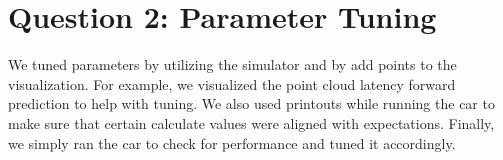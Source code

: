 \section{Question 2: Parameter Tuning}

We tuned parameters by utilizing the simulator and by add points to the visualization. For example, we visualized the point cloud latency forward prediction to help with tuning. We also used printouts while running the car to make sure that certain calculate values were aligned with expectations. Finally, we simply ran the car to check for performance and tuned it accordingly. 